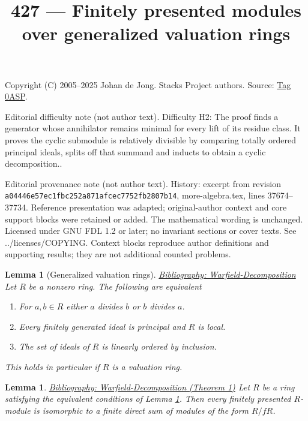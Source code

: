 \documentclass{amsart}
\newenvironment{reference}{\comment}{\endcomment}
\theoremstyle{plain}
\newtheorem{lemma}[subsection]{Lemma}
\theoremstyle{definition}
\theoremstyle{remark}
\numberwithin{equation}{subsection}
\begin{document}
\title[Stacks Project, Tag 0ASP]{427 --- Finitely presented modules over generalized valuation rings}
\maketitle
\noindent Copyright (C) 2005--2025 Johan de Jong. Stacks Project authors. Source: \href{https://stacks.math.columbia.edu/tag/0ASP}{Tag 0ASP}.

\noindent Editorial difficulty note (not author text). Difficulty H2: The proof finds a generator whose annihilator remains minimal for every lift of its residue class. It proves the cyclic submodule is relatively divisible by comparing totally ordered principal ideals, splits off that summand and inducts to obtain a cyclic decomposition..

\noindent Editorial provenance note (not author text). History: excerpt from revision \texttt{a0444\allowbreak 6e57e\allowbreak c1fbc\allowbreak 252a8\allowbreak 71afc\allowbreak ec775\allowbreak 2fb28\allowbreak 07b14}, more-algebra.tex, lines 37674--37734. Reference presentation was adapted; original-author context and core support blocks were retained or added. The mathematical wording is unchanged. Licensed under GNU FDL 1.2 or later; no invariant sections or cover texts. See ../licenses/COPYING. Context blocks reproduce author definitions and supporting results; they are not additional counted problems.

\begin{lemma}[Generalized valuation rings]
\label{lemma-generalized-valuation-ring}
\begin{reference}
\href{https://stacks.math.columbia.edu/bibliography}{Bibliography: Warfield-Decomposition}
\end{reference}
Let $R$ be a nonzero ring. The following are equivalent
\begin{enumerate}
\item For $a, b \in R$ either $a$ divides $b$ or $b$ divides $a$.
\item Every finitely generated ideal is principal and $R$ is local.
\item The set of ideals of $R$ is linearly ordered by inclusion.
\end{enumerate}
This holds in particular if $R$ is a valuation ring.
\end{lemma}

\begin{lemma}
\label{lemma-generalized-valuation-ring-modules}
\begin{reference}
\href{https://stacks.math.columbia.edu/bibliography}{Bibliography: Warfield-Decomposition (Theorem 1)}
\end{reference}
Let $R$ be a ring satisfying the equivalent conditions of
Lemma \ref{lemma-generalized-valuation-ring}.
Then every finitely presented $R$-module
is isomorphic to a finite direct sum of modules of the form $R/fR$.
\end{lemma}
\end{document}
